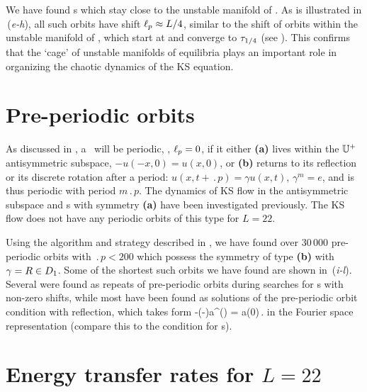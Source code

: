 

We have found \rpo s which stay
close to the unstable manifold of .
As is illustrated in \,(\textit{e-h}), all such orbits have
shift $\ell_p \approx L/4$, similar to the shift of orbits within
the unstable manifold of , which start at  and
converge to $\tau_{1/4}$ (see ). This
confirms that the `cage' of unstable manifolds of equilibria plays
an important role in organizing the chaotic dynamics of the KS
equation.


\section{Pre-periodic orbits} \label{ssec:po}

As discussed in , a \rpo\ will be
periodic, \ie, $\ell_p = 0$, if it either {\bf (a)} lives
within the $\mathbb{U}^+$ antisymmetric subspace, $-u(-x,0) =
u(x,0)$, or {\bf (b)} returns to its reflection
or its discrete rotation after a period:
$u(x,t+\period{p})=\gamma u(x,t)$, $\gamma^m=e$,
and is thus periodic with period $m\period{p}$.
The dynamics of KS flow in the antisymmetric subspace and \po
s with symmetry {\bf (a)} have been investigated
previously.
The KS flow does not have any periodic orbits of this type
for $L = 22$.

Using the algorithm and strategy described in
, we have found over 30\,000
pre-periodic orbits with $\period{p} < 200$ which possess the
symmetry of type {\bf (b)} with $\gamma=R\in D_1$.
Some of the shortest such orbits we have found are shown in
\,(\textit{i-l}). Several were found as
repeats of pre-periodic orbits during searches for \rpo s
with non-zero shifts, while most have been found as solutions
of the pre-periodic orbit condition  with
reflection, which takes form
\beq
 -(-\shift)a^\ast() = a(0)\,.
\label{KSposFour}
\eeq
in the Fourier space representation
(compare this to the condition  for \rpo s).


\section{Energy transfer rates  for $L=22$}
\label{sec:energyL22}


